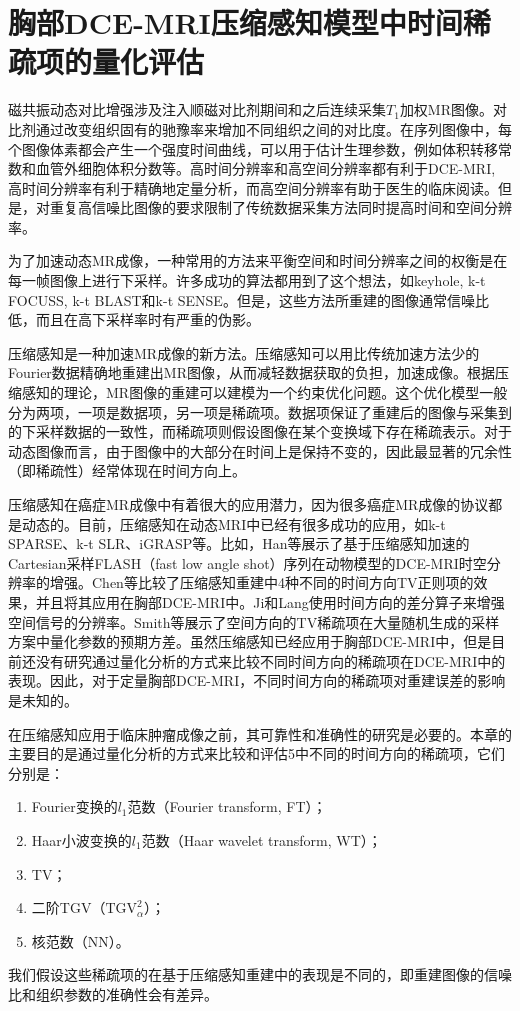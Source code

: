 \chapter{胸部DCE-MRI压缩感知模型中时间稀疏项的量化评估}
\label{chap:qetsr}
磁共振动态对比增强涉及注入顺磁对比剂期间和之后连续采集$T_1$加权MR图像\cite{Yankeelov2009}。对比剂通过改变组织固有的驰豫率来增加不同组织之间的对比度。在序列图像中，每个图像体素都会产生一个强度时间曲线，可以用于估计生理参数，例如体积转移常数\kt 和血管外细胞体积分数\Ve 等。高时间分辨率和高空间分辨率都有利于DCE-MRI, 高时间分辨率有利于精确地定量分析，而高空间分辨率有助于医生的临床阅读。但是，对重复高信噪比图像的要求限制了传统数据采集方法同时提高时间和空间分辨率。

为了加速动态MR成像，一种常用的方法来平衡空间和时间分辨率之间的权衡是在每一帧图像上进行下采样。许多成功的算法都用到了这个想法，如keyhole\cite{van1993}, k-t FOCUSS\cite{focuss}, k-t BLAST和k-t SENSE\cite{Jeffrey2003k}。但是，这些方法所重建的图像通常信噪比低，而且在高下采样率时有严重的伪影。

压缩感知是一种加速MR成像的新方法\cite{Donoho2006Compressed,Candes2006Robust}。压缩感知可以用比传统加速方法少的Fourier数据精确地重建出MR图像，从而减轻数据获取的负担，加速成像。根据压缩感知的理论，MR图像的重建可以建模为一个约束优化问题。这个优化模型一般分为两项，一项是数据项，另一项是稀疏项。数据项保证了重建后的图像与采集到的下采样数据的一致性，而稀疏项则假设图像在某个变换域下存在稀疏表示。对于动态图像而言，由于图像中的大部分在时间上是保持不变的，因此最显著的冗余性（即稀疏性）经常体现在时间方向上。

压缩感知在癌症MR成像中有着很大的应用潜力\cite{smith2013}，因为很多癌症MR成像的协议都是动态的。目前，压缩感知在动态MRI中已经有很多成功的应用，如k-t SPARSE\cite{lustig2006}、k-t SLR\cite{Sajan2011Accelerated}、iGRASP\cite{igrasp}等。比如，Han等展示了基于压缩感知加速的Cartesian采样FLASH（fast low angle shot）\cite{han}序列在动物模型的DCE-MRI时空分辨率的增强。Chen\cite{chen}等比较了压缩感知重建中4种不同的时间方向TV正则项的效果，并且将其应用在胸部DCE-MRI中。Ji和Lang\cite{ji2008}使用时间方向的差分算子来增强空间信号的分辨率。Smith\cite{smith2011,smith2012}等展示了空间方向的TV稀疏项在大量随机生成的采样方案中量化参数的预期方差。虽然压缩感知已经应用于胸部DCE-MRI中，但是目前还没有研究通过量化分析的方式来比较不同时间方向的稀疏项在DCE-MRI中的表现。因此，对于定量胸部DCE-MRI，不同时间方向的稀疏项对重建误差的影响是未知的。

在压缩感知应用于临床肿瘤成像之前，其可靠性和准确性的研究是必要的。本章的主要目的是通过量化分析的方式来比较和评估5中不同的时间方向的稀疏项，它们分别是：
\begin{enumerate}
	\item Fourier变换的$l_1$范数（Fourier transform, FT）；
	\item Haar小波变换的$l_1$范数（Haar wavelet transform, WT）；
	\item TV；
	\item 二阶TGV（$\textrm{TGV}_{\alpha}^2$）；
	\item 核范数（NN）。
\end{enumerate}
我们假设这些稀疏项的在基于压缩感知重建中的表现是不同的，即重建图像的信噪比和组织参数的准确性会有差异。

